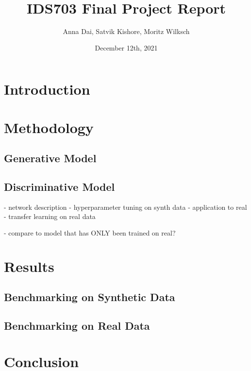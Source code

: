 \documentclass[11pt]{article}
\title{IDS703 Final Project Report}
\author{Anna Dai, Satvik Kishore, Moritz Wilksch}
\date{December 12th, 2021}
\begin{document}
\maketitle

\section{Introduction}

\section{Methodology}

\subsection{Generative Model}



\subsection{Discriminative Model}
- network description
- hyperparameter tuning on synth data
- application to real
- transfer learning on real data

- compare to model that has ONLY been trained on real?

\section{Results}
\subsection{Benchmarking on Synthetic Data}

\begin{center}
	
\end{center}


\subsection{Benchmarking on Real Data}

\section{Conclusion}
\begin{adjustbox}{width=\columnwidth,center}

\end{adjustbox}
\end{document}

